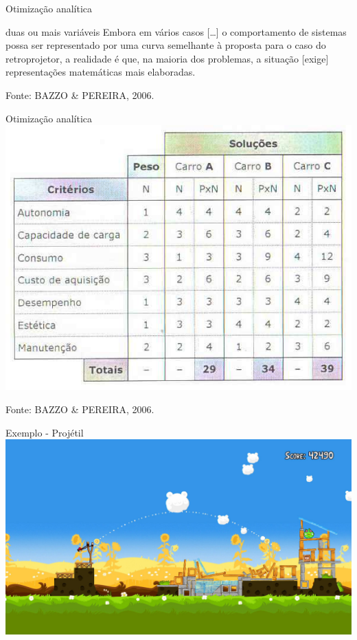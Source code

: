 \documentclass{beamer}
\begin{document}
\begin{frame}{Otimização analítica}
  \begin{block}{duas ou mais variáveis}
    Embora em vários casos [\ldots] o comportamento de sistemas possa
    ser representado por uma curva semelhante à proposta para o caso
    do retroprojetor, a realidade é que, na maioria dos problemas, a
    situação [exige] representações matemáticas mais elaboradas.
  \end{block}

\vfill
Fonte: BAZZO \& PEREIRA, 2006.
\end{frame}

\begin{frame}{Otimização analítica}
  \centering
  \includegraphics[height=.8\textheight]{otimizacao/2var}

\vfill
Fonte: BAZZO \& PEREIRA, 2006.
\end{frame}

\begin{frame}{Exemplo - Projétil}
  \centering
  \includegraphics[width=\textwidth]{otimizacao/angrybirds}
\end{frame}
\end{document}

